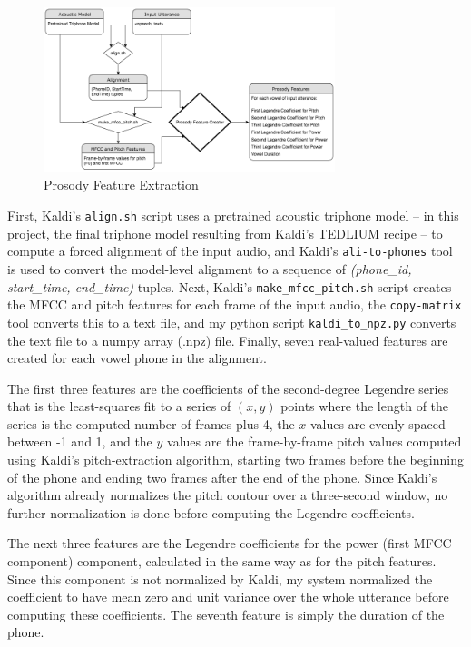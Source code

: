 \documentclass{article}
\begin{document}
\begin{figure}[htb]

\begin{minipage}[b]{1.0\linewidth}
  \centering
  \centerline{\includegraphics[width=8.5cm]{Prosody_Extraction.png}}
\end{minipage}
\caption{Prosody Feature Extraction}
\label{fig:prosodyextraction}
\end{figure}

First, Kaldi's \texttt{align.sh} script uses a pretrained acoustic triphone model -- in this project, the final triphone model resulting from Kaldi's TEDLIUM recipe -- to compute a forced alignment of the input audio, and Kaldi's \texttt{ali-to-phones} tool is used to convert the model-level alignment to a sequence of \textit{(phone\_id, start\_time, end\_time)} tuples.
Next, Kaldi's \texttt{make\_mfcc\_pitch.sh} script creates the MFCC and pitch features for each frame of the input audio, the \texttt{copy-matrix} tool converts this to a text file, and my python script \texttt{kaldi\_to\_npz.py} converts the text file to a numpy array (.npz) file.
Finally, seven real-valued features are created for each vowel phone in the alignment.

The first three features are the coefficients of the second-degree Legendre series that is the least-squares fit to a series of $(x, y)$ points where the length of the series is the computed number of frames plus 4, the $x$ values are evenly spaced between -1 and 1, and the $y$ values are the frame-by-frame pitch values computed using Kaldi's pitch-extraction algorithm, starting two frames before the beginning of the phone and ending two frames after the end of the phone.
Since Kaldi's algorithm already normalizes the pitch contour over a three-second window, no further normalization is done before computing the Legendre coefficients.

The next three features are the Legendre coefficients for the power (first MFCC component) component, calculated in the same way as for the pitch features. Since this component is not normalized by Kaldi, my system normalized the coefficient to have mean zero and unit variance over the whole utterance before computing these coefficients.
The seventh feature is simply the duration of the phone.
\end{document}
